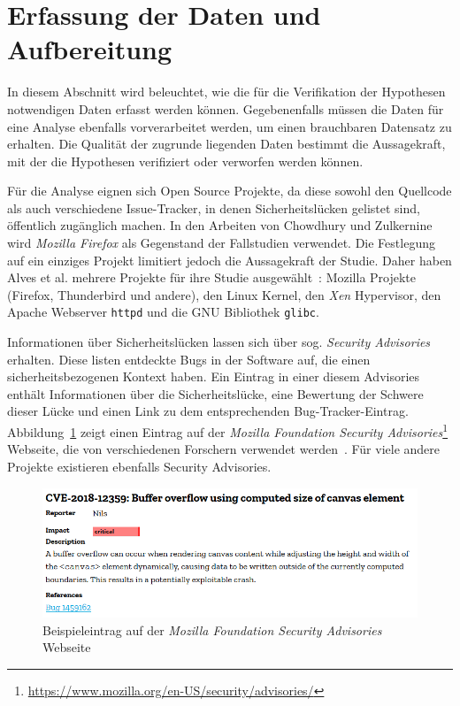 \section{Erfassung der Daten und Aufbereitung}
\label{sec:erfassung}
In diesem Abschnitt wird beleuchtet, wie die für die Verifikation der Hypothesen notwendigen Daten erfasst werden können.
Gegebenenfalls müssen die Daten für eine Analyse ebenfalls vorverarbeitet werden, um einen brauchbaren Datensatz zu erhalten.
Die Qualität der zugrunde liegenden Daten bestimmt die Aussagekraft, mit der die Hypothesen verifiziert oder verworfen werden können.

Für die Analyse eignen sich Open Source Projekte,
da diese sowohl den Quellcode als auch verschiedene Issue-Tracker,
in denen Sicherheitslücken gelistet sind,
öffentlich zugänglich machen.
In den Arbeiten von Chowdhury und Zulkernine~\cite{chowdhury_zulkernine_2010,chowdhury_zulkernine_2009} wird \emph{Mozilla Firefox} als Gegenstand der Fallstudien verwendet.
Die Festlegung auf ein einziges Projekt limitiert jedoch die Aussagekraft der Studie.
Daher haben Alves et al. mehrere Projekte für ihre Studie ausgewählt~\cite{alves_et_al}: 
Mozilla Projekte (Firefox, Thunderbird und andere),
den Linux Kernel,
den \emph{Xen} Hypervisor,
den Apache Webserver \texttt{httpd} und
die GNU Bibliothek \texttt{glibc}.

Informationen über Sicherheitslücken lassen sich über sog. \emph{Security Advisories} erhalten.
Diese listen entdeckte Bugs in der Software auf, die einen sicherheitsbezogenen Kontext haben.
Ein Eintrag in einer diesem Advisories enthält Informationen über die Sicherheitslücke, eine Bewertung der Schwere dieser Lücke und einen Link zu dem entsprechenden Bug-Tracker-Eintrag.
Abbildung~\ref{fig:mfsa} zeigt einen Eintrag auf der \textit{Mozilla Foundation Security Advisories}\footnote{\url{https://www.mozilla.org/en-US/security/advisories/}} Webseite, die von verschiedenen Forschern verwendet werden~\cite{alves_et_al,chowdhury_zulkernine_2010}.
Für viele andere Projekte existieren ebenfalls Security Advisories.
\begin{figure}
	\includegraphics[width=\textwidth]{img/mfsa_example.png}
	\caption{Beispieleintrag auf der \textit{Mozilla Foundation Security Advisories} Webseite}
	\label{fig:mfsa}
\end{figure}

